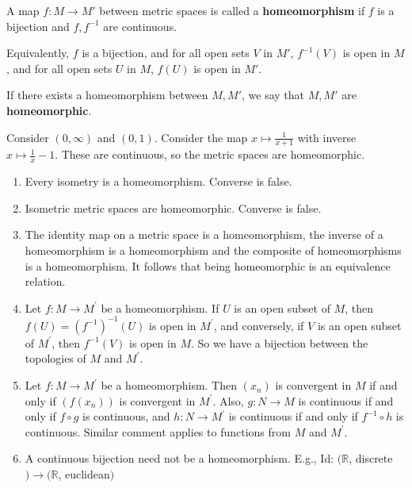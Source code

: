 \documentclass[a4paper]{article}
\begin{document}
\begin{definition}
	A map \( f \colon M \to M' \) between metric spaces is called a \textbf{homeomorphism} if \( f \) is a bijection and \( f, f^{-1} \) are continuous.

	Equivalently, \( f \) is a bijection, and for all open sets \( V \) in \( M' \), \( f^{-1}(V) \) is open in \( M \), and for all open sets \( U \) in \( M \), \( f(U) \) is open in \( M' \).

	If there exists a homeomorphism between \( M, M' \), we say that \( M, M' \) are \textbf{homeomorphic}.
\end{definition}
\begin{example}
	Consider \( (0,\infty) \) and \( (0,1) \).
	Consider the map \( x \mapsto \frac{1}{x+1} \) with inverse \( x \mapsto \frac{1}{x} - 1 \).
	These are continuous, so the metric spaces are homeomorphic.
\end{example}
\begin{remark}
\begin{enumerate}
    \item Every isometry is a homeomorphism. Converse is false.
    \item Isometric metric spaces are homeomorphic. Converse is false.
    \item The identity map on a metric space is a homeomorphism, the inverse of a homeomorphism is a homeomorphism and the composite of homeomorphisms is a homeomorphism. It follows that being homeomorphic is an equivalence relation.
    \item Let $f: M \rightarrow M^{\prime}$ be a homeomorphism. If $U$ is an open subset of $M$, then $f(U)=\left(f^{-1}\right)^{-1}(U)$ is open in $M^{\prime}$, and conversely, if $V$ is an open subset of $M^{\prime}$, then $f^{-1}(V)$ is open in $M$. So we have a bijection between the topologies of $M$ and $M^{\prime}$.
    \item Let $f: M \rightarrow M^{\prime}$ be a homeomorphism. Then $\left(x_n\right)$ is convergent in $M$ if and only if $\left(f\left(x_n\right)\right)$ is convergent in $M^{\prime}$. Also, $g: N \rightarrow M$ is continuous if and only if $f \circ g$ is continuous, and $h: N \rightarrow M^{\prime}$ is continuous if and only if $f^{-1} \circ h$ is continuous. Similar comment applies to functions from $M$ and $M^{\prime}$.
    \item A continuous bijection need not be a homeomorphism. E.g.,
    Id: $(\mathbb{R}$, discrete$) \rightarrow(\mathbb{R}$, euclidean$)$
\end{enumerate}
\end{remark}
\end{document}
